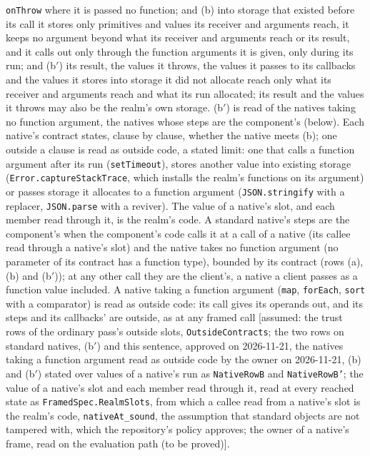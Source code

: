 \documentclass[10pt,a4paper]{article}
\theoremstyle{definition}
\theoremstyle{remark}
\newcommand{\code}[1]{\texttt{#1}}
\newcommand{\lean}[1]{\texttt{\small #1}}
\newcommand{\status}[1]{\textsf{\small[#1]}}
\begin{document}
\begin{description}[leftmargin=1.5em,style=nextline]
\code{onThrow} where it is passed no function; and (b) into storage
that existed before its call it stores only primitives and values its
receiver and arguments reach, it keeps no argument beyond what its
receiver and arguments reach or its result, and it calls out only
through the function arguments it is given, only during its run; and
(b$'$) its result, the values it throws, the values it passes to its
callbacks and the values it stores into storage it did not allocate reach
only what its receiver and arguments reach and what its run allocated; its
result and the values it throws may also be the realm's own storage.
(b$'$) is read of the natives taking no function argument, the natives
whose steps are the component's (below). Each
native's contract states, clause by clause, whether the native meets
(b); one outside a clause is read as outside code, a stated limit: one
that calls a function argument after its run
(\code{setTimeout}), stores another value into existing storage
(\code{Error.captureStackTrace}, which installs the realm's functions on
its argument) or passes storage it allocates to a function argument
(\code{JSON.stringify} with a replacer, \code{JSON.parse} with a
reviver). The value of a native's slot, and each member read
through it, is the realm's code.
A standard native's steps are the component's when the component's code
calls it at a call of a native (its callee read through a native's slot)
and the native takes no function argument (no parameter of its contract
has a function type), bounded by its contract (rows (a), (b) and (b$'$));
at any other call they are the client's, a native a client passes as a
function value included. A native taking a function argument
(\code{map}, \code{forEach}, \code{sort} with a comparator) is read as
outside code: its call gives its operands out, and its steps and its
callbacks' are outside, as at any framed call
\status{assumed: the trust rows of the ordinary pass's outside slots, \lean{OutsideContracts}; the two rows on standard natives, (b$'$) and this sentence, approved on 2026-11-21, the natives taking a function argument read as outside code by the owner on 2026-11-21, (b) and (b$'$) stated over values of a native's run as \lean{NativeRowB} and \lean{NativeRowB'}; the value of a native's slot and each member read through it, read at every reached state as \lean{FramedSpec.RealmSlots}, from which a callee read from a native's slot is the realm's code, \lean{nativeAt\_sound}, the assumption that standard objects are not tampered with, which the repository's policy approves; the owner of a native's frame, read on the evaluation path (to be proved)}.

\end{description}
\end{document}
